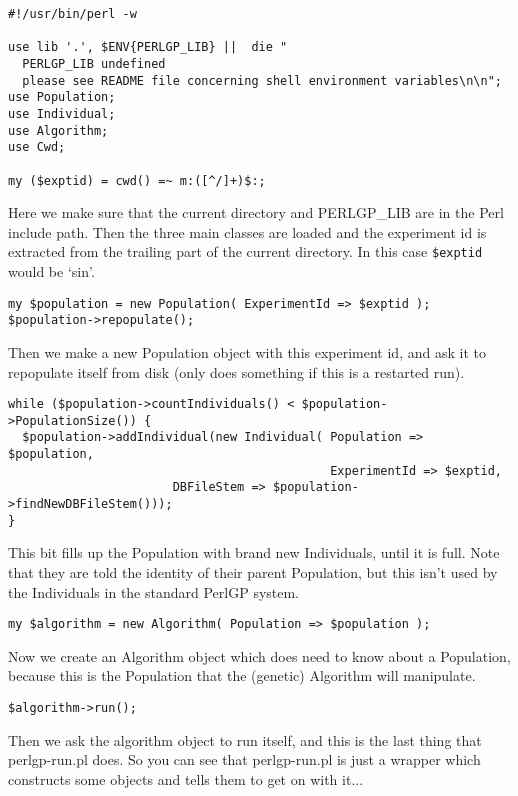 \documentclass[a4paper]{article}
\begin{document}
\begin{verbatim}
#!/usr/bin/perl -w

use lib '.', $ENV{PERLGP_LIB} ||  die "
  PERLGP_LIB undefined
  please see README file concerning shell environment variables\n\n";
use Population;
use Individual;
use Algorithm;
use Cwd;

my ($exptid) = cwd() =~ m:([^/]+)$:;
\end{verbatim} %

Here we make sure that the current directory and PERLGP\_LIB are in
the Perl include path.  Then the three main classes are loaded and the
experiment id is extracted from the trailing part of the current
directory.  In this case \texttt{\$exptid} would be `sin'.

\begin{verbatim}
my $population = new Population( ExperimentId => $exptid );
$population->repopulate();
\end{verbatim} %

Then we make a new Population object with this experiment id, and ask
it to repopulate itself from disk (only does something if this is a
restarted run).

\begin{verbatim}
while ($population->countIndividuals() < $population->PopulationSize()) {
  $population->addIndividual(new Individual( Population => $population,
                                             ExperimentId => $exptid,
                       DBFileStem => $population->findNewDBFileStem()));
}
\end{verbatim}

This bit fills up the Population with brand new Individuals, until it
is full.  Note that they are told the identity of their parent
Population, but this isn't used by the Individuals in the standard
PerlGP system.

\begin{verbatim}
my $algorithm = new Algorithm( Population => $population );
\end{verbatim}

Now we create an Algorithm object which does need to know about a
Population, because this is the Population that the (genetic)
Algorithm will manipulate.

\begin{verbatim}
$algorithm->run();
\end{verbatim} %

Then we ask the algorithm object to run itself, and this is the last
thing that perlgp-run.pl does.  So you can see that perlgp-run.pl is
just a wrapper which constructs some objects and tells them to get on
with it...
\end{document}
